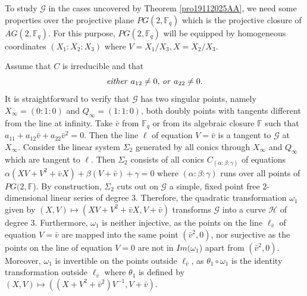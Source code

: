 \documentclass[sn-mathphys-num]{sn-jnl}%
\begin{document}
To study $\mathcal{G}$ in the cases uncovered by Theorem \ref{pro19112025AA}, we need some properties over the projective plane $PG(2,\mathbb{F}_q)$ which is the projective closure of $AG(2,\mathbb{F}_q)$. For this purpose, $PG(2,\mathbb{F}_q)$ will be equipped by homogeneous coordinates $(X_1:X_2:X_3)$ where
$V=X_1/X_3,X=X_2/X_3$.



Assume that $C$ is irreducible and that 
\begin{equation}
\label{eq17112025}
{\mbox{\emph{either} $a_{12}\ne 0$, \emph{or} $a_{22}\ne 0$}}.
\end{equation}
It is straightforward to verify that $\mathcal{G}$ has two singular points, namely $X_\infty=(0:1:0)$ and $Q_\infty=(1:1:0)$, both doubly points with tangents different from the line at infinity.
Take $\bar{v}$ from $\mathbb{F}_q$ or from its algebraic closure $\mathbb{F}$ such that $a_{11}+a_{12}\bar{v}+a_{22}\bar{v}^2=0$.
Then the line $\ell$ of equation $V=\bar{v}$ is a tangent  to $\mathcal{G}$ at $X_\infty$.
Consider the linear system $\Sigma_2$ generated by all conics through $X_\infty$ and $Q_\infty$ which are tangent to $\ell$. Then $\Sigma_2$
consists of all conics $C_{(\alpha:\beta:\gamma)}$ of equations $\alpha(XV+V^2+\bar{v}X)+\beta (V+\bar{v})+\gamma=0$
where $(\alpha:\beta:\gamma)$ runs over all points of $PG(2,\mathbb{F}$). By construction, $\Sigma_2$ cuts out on $\mathcal{G}$ a simple, fixed point free $2$-dimensional linear series of degree $3$.
Therefore, the quadratic transformation $\omega_1$ given by $(X,V)\mapsto (XV+V^2+\bar{v}X,V+\bar{v})$ transforms $\mathcal{G}$ into a curve $\mathcal{H}$ of degree $3$.
Furthermore, $\omega_1$ is neither injective, as the points on the line $\ell_{\bar{v}}$ of equation $V=\bar{v}$ are mapped into the same point $(\bar{v}^2,0)$, nor surjective as the points on the line of equation $V=0$ are not in $Im(\omega_1$) apart from $(\bar{v}^2,0)$.
Moreover, $\omega_1$ is invertible on the points outside $\ell_{\bar{v}}$, as $\theta_1\circ \omega_1$ is the identity transformation outside $\ell_{\bar{v}}$ where $\theta_1$ is defined by $(X,V)\mapsto ((X+V^2+\bar{v}^2)V^{-1},V+\bar{v})$.
\end{document}
